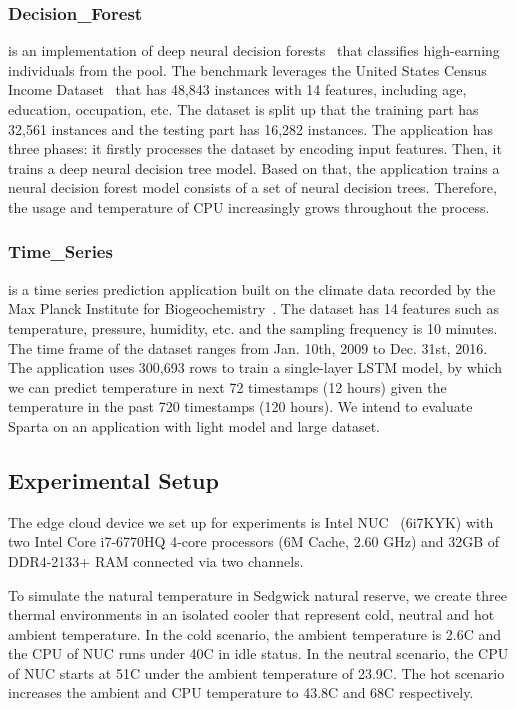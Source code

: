 \subsubsection{Decision\_Forest} is an implementation of deep neural decision forests~\cite{ref:decision_forest} that classifies high-earning individuals from the pool. The benchmark leverages the United States Census Income Dataset~\cite{ref:uci} that has 48,843 instances with 14 features, including age, education, occupation, etc. The dataset is split up that the training part has 32,561 instances and the testing part has 16,282 instances. The application has three phases: it firstly processes the dataset by encoding input features. Then, it trains a deep neural decision tree model. Based on that, the application trains a neural decision forest model consists of a set of neural decision trees. Therefore, the usage and temperature of CPU increasingly grows throughout the process.


\subsubsection{Time\_Series} is a time series prediction application built on the climate data recorded by the Max Planck Institute for Biogeochemistry~\cite{ref:jena}. The dataset has 14 features such as temperature, pressure, humidity, etc. and the sampling frequency is 10 minutes. The time frame of the dataset ranges from Jan. 10th, 2009 to Dec. 31st, 2016. The application uses 300,693 rows to train a single-layer LSTM model, by which we can predict temperature in next 72 timestamps (12 hours) given the temperature in the past 720 timestamps (120 hours). We intend to evaluate Sparta on an application with light model and large dataset.


\subsection{Experimental Setup}

The edge cloud device we set up for experiments is Intel NUC~\cite{ref:nuc} (6i7KYK) with two Intel Core i7-6770HQ 4-core processors (6M Cache, 2.60 GHz) and 32GB of DDR4-2133+ RAM connected via two channels.  

To simulate the natural temperature in Sedgwick natural reserve, we create three thermal environments in an isolated cooler that represent cold, neutral and hot ambient temperature. In the cold scenario, the ambient temperature is 2.6\degree C and the CPU of NUC runs under 40\degree C in idle status. In the neutral scenario, the CPU of NUC starts at 51\degree C under the ambient temperature of 23.9\degree C. The hot scenario increases the ambient and CPU temperature to 43.8\degree C and 68\degree C respectively.

